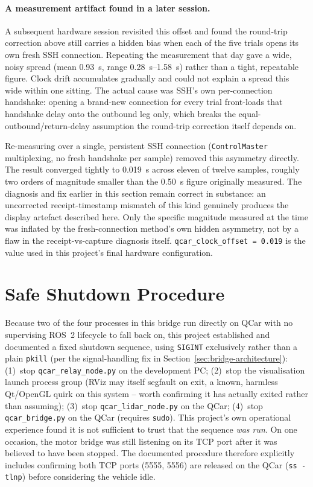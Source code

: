 \paragraph{A measurement artifact found in a later session.} A
subsequent hardware session revisited this offset and found the
round-trip correction above still carries a hidden bias when each of
the five trials opens its own fresh SSH connection. Repeating the
measurement that day gave a wide, noisy spread (mean
\SI{0.93}{\second}, range \SI{0.28}{\second}--\SI{1.58}{\second})
rather than a tight, repeatable figure. Clock drift accumulates
gradually and could not explain a spread this wide within one
sitting. The actual cause was SSH's own per-connection handshake:
opening a brand-new connection for every trial front-loads that
handshake delay onto the outbound leg only, which breaks the
equal-outbound/return-delay assumption the round-trip correction
itself depends on.

Re-measuring over a single, persistent SSH connection
(\texttt{ControlMaster} multiplexing, no fresh handshake per sample)
removed this asymmetry directly. The result converged tightly to
\SI{0.019}{\second} across eleven of twelve samples, roughly two
orders of magnitude smaller than the \SI{0.50}{\second} figure
originally measured. The diagnosis and fix earlier in this section
remain correct in substance: an uncorrected receipt-timestamp
mismatch of this kind genuinely produces the display artefact
described here. Only the specific magnitude measured at the time was
inflated by the fresh-connection method's own hidden asymmetry, not
by a flaw in the receipt-vs-capture diagnosis itself.
\texttt{qcar\_clock\_offset = 0.019} is the value used in this
project's final hardware configuration.

\section{Safe Shutdown Procedure}
\label{sec:safe-shutdown}

Because two of the four processes in this bridge run directly on
QCar with no supervising ROS~2 lifecycle to fall back
on, this project established and documented a fixed shutdown
sequence, using \texttt{SIGINT} exclusively rather than a plain
\texttt{pkill} (per the signal-handling fix in
Section~\ref{sec:bridge-architecture}):
(1)~stop \texttt{qcar\_relay\_node.py} on the development PC;
(2)~stop the visualisation launch process group (RViz may itself
segfault on exit, a known, harmless Qt/OpenGL quirk on this system --
worth confirming it has actually exited rather than assuming);
(3)~stop \texttt{qcar\_lidar\_node.py} on the QCar;
(4)~stop \texttt{qcar\_bridge.py} on the QCar (requires \texttt{sudo}).
This project's own operational experience found it is not sufficient
to trust that the sequence \emph{was run}. On one occasion, the
motor bridge was still listening on its TCP port after it was
believed to have been stopped. The documented procedure therefore
explicitly includes confirming both TCP ports (5555, 5556) are
released on the QCar (\texttt{ss -tlnp}) before considering the
vehicle idle.

